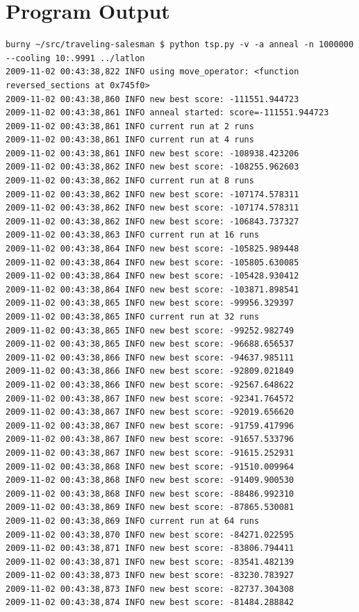 \documentclass[12pt]{article}
\begin{document}
\section{Program Output}
\tiny\begin{verbatim}
burny ~/src/traveling-salesman $ python tsp.py -v -a anneal -n 1000000 --cooling 10:.9991 ../latlon
2009-11-02 00:43:38,822 INFO using move_operator: <function reversed_sections at 0x745f0>
2009-11-02 00:43:38,860 INFO new best score: -111551.944723
2009-11-02 00:43:38,861 INFO anneal started: score=-111551.944723
2009-11-02 00:43:38,861 INFO current run at 2 runs
2009-11-02 00:43:38,861 INFO current run at 4 runs
2009-11-02 00:43:38,861 INFO new best score: -108938.423206
2009-11-02 00:43:38,862 INFO new best score: -108255.962603
2009-11-02 00:43:38,862 INFO current run at 8 runs
2009-11-02 00:43:38,862 INFO new best score: -107174.578311
2009-11-02 00:43:38,862 INFO new best score: -107174.578311
2009-11-02 00:43:38,862 INFO new best score: -106843.737327
2009-11-02 00:43:38,863 INFO current run at 16 runs
2009-11-02 00:43:38,864 INFO new best score: -105825.989448
2009-11-02 00:43:38,864 INFO new best score: -105805.630085
2009-11-02 00:43:38,864 INFO new best score: -105428.930412
2009-11-02 00:43:38,864 INFO new best score: -103871.898541
2009-11-02 00:43:38,865 INFO new best score: -99956.329397
2009-11-02 00:43:38,865 INFO current run at 32 runs
2009-11-02 00:43:38,865 INFO new best score: -99252.982749
2009-11-02 00:43:38,865 INFO new best score: -96688.656537
2009-11-02 00:43:38,866 INFO new best score: -94637.985111
2009-11-02 00:43:38,866 INFO new best score: -92809.021849
2009-11-02 00:43:38,866 INFO new best score: -92567.648622
2009-11-02 00:43:38,867 INFO new best score: -92341.764572
2009-11-02 00:43:38,867 INFO new best score: -92019.656620
2009-11-02 00:43:38,867 INFO new best score: -91759.417996
2009-11-02 00:43:38,867 INFO new best score: -91657.533796
2009-11-02 00:43:38,867 INFO new best score: -91615.252931
2009-11-02 00:43:38,868 INFO new best score: -91510.009964
2009-11-02 00:43:38,868 INFO new best score: -91409.900530
2009-11-02 00:43:38,868 INFO new best score: -88486.992310
2009-11-02 00:43:38,869 INFO new best score: -87865.530081
2009-11-02 00:43:38,869 INFO current run at 64 runs
2009-11-02 00:43:38,870 INFO new best score: -84271.022595
2009-11-02 00:43:38,871 INFO new best score: -83806.794411
2009-11-02 00:43:38,871 INFO new best score: -83541.482139
2009-11-02 00:43:38,873 INFO new best score: -83230.783927
2009-11-02 00:43:38,873 INFO new best score: -82737.304308
2009-11-02 00:43:38,874 INFO new best score: -81484.288842

\end{verbatim}
\end{document}
